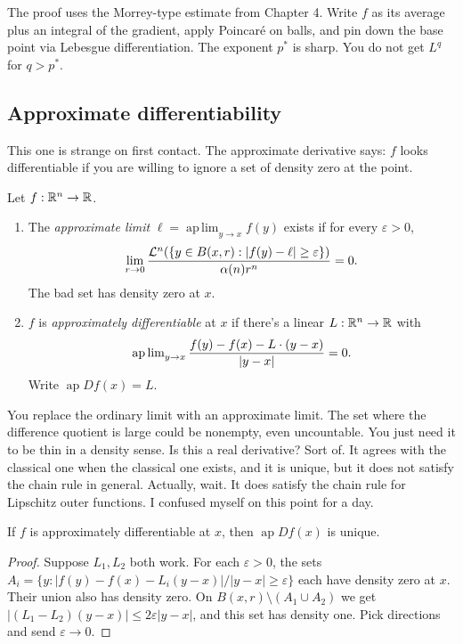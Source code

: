 The proof uses the Morrey-type estimate from Chapter 4. Write $f$ as its average plus an integral of the gradient, apply Poincar\'e on balls, and pin down the base point via Lebesgue differentiation. The exponent $p^*$ is sharp. You do not get $L^q$ for $q > p^*$.

\subsection{Approximate differentiability}\label{subsec:ap-diff}

This one is strange on first contact. The approximate derivative says: $f$ looks differentiable if you are willing to ignore a set of density zero at the point.

\begin{definition}\label{def:ap-diff}
Let $f : \mathbb{R}^n \to \mathbb{R}$.
\begin{enumerate}
    \item The \emph{approximate limit} $\ell = \operatorname{ap\,lim}_{y \to x} f(y)$ exists if for every $\varepsilon > 0$,
    \[
        \lim_{r \to 0} \frac{\mathcal{L}^n(\{y \in B(x,r) : \left|f(y) - \ell\right| \ge \varepsilon\})}{\alpha(n) r^n} = 0.
    \]
    The bad set has density zero at $x$.

    \item $f$ is \emph{approximately differentiable} at $x$ if there's a linear $L : \mathbb{R}^n \to \mathbb{R}$ with
    \[
        \operatorname{ap\,lim}_{y \to x} \frac{f(y) - f(x) - L \cdot (y - x)}{\left|y - x\right|} = 0.
    \]
    Write $\operatorname{ap} Df(x) = L$.
\end{enumerate}
\end{definition}

You replace the ordinary limit with an approximate limit. The set where the difference quotient is large could be nonempty, even uncountable. You just need it to be thin in a density sense. Is this a real derivative? Sort of. It agrees with the classical one when the classical one exists, and it is unique, but it does not satisfy the chain rule in general. Actually, wait. It does satisfy the chain rule for Lipschitz outer functions. I confused myself on this point for a day.

\begin{theorem}\label{thm:ap-deriv-unique}
If $f$ is approximately differentiable at $x$, then $\operatorname{ap} Df(x)$ is unique.
\end{theorem}

\begin{proof}
Suppose $L_1, L_2$ both work. For each $\varepsilon > 0$, the sets $A_i = \{y : |f(y) - f(x) - L_i(y-x)|/|y-x| \ge \varepsilon\}$ each have density zero at $x$. Their union also has density zero. On $B(x,r) \setminus (A_1 \cup A_2)$ we get $|(L_1 - L_2)(y-x)| \le 2\varepsilon|y-x|$, and this set has density one. Pick directions and send $\varepsilon \to 0$.
\end{proof}

